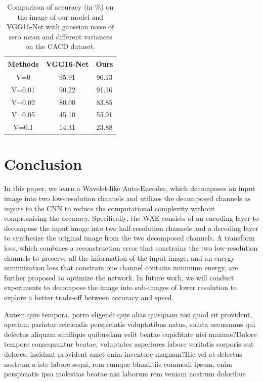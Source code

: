 \documentclass[letterpaper]{article} %
\begin{document}
\begin{table}[htbp]
\centering
\begin{tabular}{c|c|c}
\hline
Methods & VGG16-Net & Ours \\
\hline
V=0   & 95.91 & 96.13    \\
V=0.01   & 90.22  &  91.16     \\
V=0.02   & 80.00  &  83.85     \\
V=0.05   & 45.10  &  55.91     \\
V=0.1   & 14.31  &   23.88    \\
\hline
\end{tabular}
\caption{Comparison of accuracy (in \%) on the image of our model and VGG16-Net with gaussian noise of zero mean and different variances on the CACD dataset.}
\label{table:cacd_noise}
\end{table}


\vspace{-1.57mm}
\section{Conclusion}
In this paper, we learn a Wavelet-like Auto-Encoder, which decomposes an input image into two low-resolution channels and utilizes the decomposed channels as inputs to the CNN to reduce the computational complexity without compromising the accuracy. Specifically, the WAE consists of an encoding layer to decompose the input image into two half-resolution channels and a decoding layer to synthesize the original image from the two decomposed channels. A transform loss, which combines a reconstruction error that constrains the two low-resolution channels to preserve all the information of the input image, and an energy minimization loss that constrain one channel contains minimum energy, are further proposed to optimize the network.
In future work, we will conduct experiments to decompose the image into sub-images of lower resolution to explore a better trade-off between accuracy and speed.


Autem quis tempora, porro eligendi quis alias quisquam nisi quod sit provident, aperiam pariatur reiciendis perspiciatis voluptatibus natus, soluta accusamus qui delectus aliquam similique quibusdam velit beatae cupiditate nisi maxime?Dolore tempore consequuntur beatae, voluptates asperiores labore veritatis corporis aut dolores, incidunt provident amet enim inventore magnam?Hic vel at delectus nostrum a iste labore sequi, rem cumque blanditiis commodi ipsum, enim perspiciatis ipsa molestias beatae nisi laborum rem veniam nostrum doloribus

\end{document}
